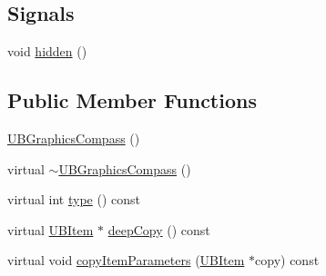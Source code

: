 \subsection*{Signals}
\begin{DoxyCompactItemize}
\item 
void \hyperlink{class_u_b_graphics_compass_a020e213fd9eaca2dbb038e76459dd156}{hidden} ()
\end{DoxyCompactItemize}
\subsection*{Public Member Functions}
\begin{DoxyCompactItemize}
\item 
\hyperlink{class_u_b_graphics_compass_a91a6c74574ce890cbc0e81eab39c0389}{U\-B\-Graphics\-Compass} ()
\item 
virtual \hyperlink{class_u_b_graphics_compass_a638747f45bb75fd36e1a05f239fa7a89}{$\sim$\-U\-B\-Graphics\-Compass} ()
\item 
virtual int \hyperlink{class_u_b_graphics_compass_aa6fc0068077c966eff310cbff640a45a}{type} () const 
\item 
virtual \hyperlink{class_u_b_item}{U\-B\-Item} $\ast$ \hyperlink{class_u_b_graphics_compass_aa92ffb4c40fee74462a5a0fc165d1dce}{deep\-Copy} () const 
\item 
virtual void \hyperlink{class_u_b_graphics_compass_a6ddc850411604453d18acdfd26e4020f}{copy\-Item\-Parameters} (\hyperlink{class_u_b_item}{U\-B\-Item} $\ast$copy) const 
\end{DoxyCompactItemize}

